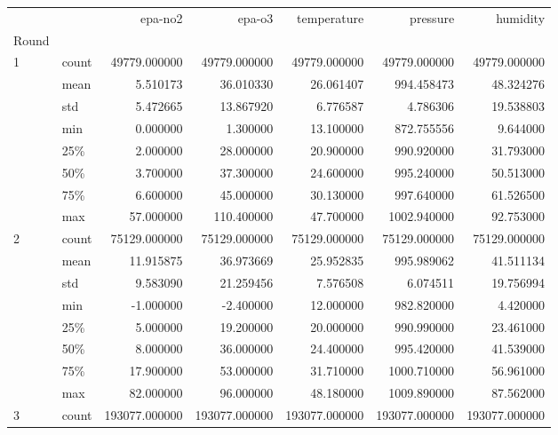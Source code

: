 \begin{tabular}{llrrrrr}
\toprule
  &       &        epa-no2 &         epa-o3 &    temperature &       pressure &       humidity \\
Round & {} &                &                &                &                &                \\
\midrule
1 & count &   49779.000000 &   49779.000000 &   49779.000000 &   49779.000000 &   49779.000000 \\
  & mean &       5.510173 &      36.010330 &      26.061407 &     994.458473 &      48.324276 \\
  & std &       5.472665 &      13.867920 &       6.776587 &       4.786306 &      19.538803 \\
  & min &       0.000000 &       1.300000 &      13.100000 &     872.755556 &       9.644000 \\
  & 25\% &       2.000000 &      28.000000 &      20.900000 &     990.920000 &      31.793000 \\
  & 50\% &       3.700000 &      37.300000 &      24.600000 &     995.240000 &      50.513000 \\
  & 75\% &       6.600000 &      45.000000 &      30.130000 &     997.640000 &      61.526500 \\
  & max &      57.000000 &     110.400000 &      47.700000 &    1002.940000 &      92.753000 \\
2 & count &   75129.000000 &   75129.000000 &   75129.000000 &   75129.000000 &   75129.000000 \\
  & mean &      11.915875 &      36.973669 &      25.952835 &     995.989062 &      41.511134 \\
  & std &       9.583090 &      21.259456 &       7.576508 &       6.074511 &      19.756994 \\
  & min &      -1.000000 &      -2.400000 &      12.000000 &     982.820000 &       4.420000 \\
  & 25\% &       5.000000 &      19.200000 &      20.000000 &     990.990000 &      23.461000 \\
  & 50\% &       8.000000 &      36.000000 &      24.400000 &     995.420000 &      41.539000 \\
  & 75\% &      17.900000 &      53.000000 &      31.710000 &    1000.710000 &      56.961000 \\
  & max &      82.000000 &      96.000000 &      48.180000 &    1009.890000 &      87.562000 \\
3 & count &  193077.000000 &  193077.000000 &  193077.000000 &  193077.000000 &  193077.000000 \\

\end{tabular}
